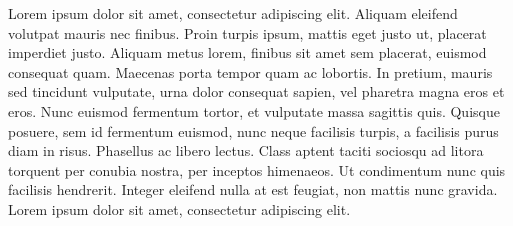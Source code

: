 Lorem ipsum dolor sit amet, consectetur adipiscing elit. Aliquam eleifend volutpat mauris nec finibus. Proin turpis ipsum, mattis eget justo ut, placerat imperdiet justo. Aliquam metus lorem, finibus sit amet sem placerat, euismod consequat quam. Maecenas porta tempor quam ac lobortis. In pretium, mauris sed tincidunt vulputate, urna dolor consequat sapien, vel pharetra magna eros et eros. Nunc euismod fermentum tortor, et vulputate massa sagittis quis. Quisque posuere, sem id fermentum euismod, nunc neque facilisis turpis, a facilisis purus diam in risus. Phasellus ac libero lectus. Class aptent taciti sociosqu ad litora torquent per conubia nostra, per inceptos himenaeos. Ut condimentum nunc quis facilisis hendrerit. Integer eleifend nulla at est feugiat, non mattis nunc gravida. Lorem ipsum dolor sit amet, consectetur adipiscing elit. 
